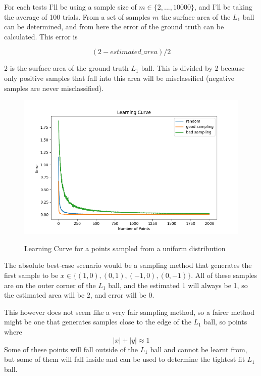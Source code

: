 \documentclass[11pt,a4paper]{article}
\begin{document}
For each tests I'll be using a sample size of $m \in \{2, ... , 10000 \}$, and I'll be taking the average of 100 trials. From a set of samples $m$ the surface area of the  $L_1$ ball can be determined, and from here the error of the ground truth can be calculated. This error is 

\[(2 - \textit{estimated\_area}) / 2\]

$2$ is the surface area of the ground truth $L_1$ ball. This is divided by 2 because only positive samples that fall into this area will be misclassified (negative samples are never misclassified).


\begin{figure}[h]
    \caption{Learning Curve for a points sampled from a uniform distribution}
    \centering
    \includegraphics[width=\textwidth]{learning_curves.png}
    \label{fig:learning_curve}
\end{figure}

The absolute best-case scenario would be a sampling method that generates the first sample to be $x \in \{(1,0), (0,1), (-1,0), (0,-1)\}$.
All of these samples are on the outer corner of the $L_1$ ball, and the estimated $1$ will always be 1, so the estimated area will be $2$, and error will be $0$.

This however does not seem like a very fair sampling method, so a fairer method might be one that generates samples close to the edge of the $L_1$ ball, so points where 
\[|x| + |y| \approx 1\]
Some of these points will fall outside of the $L_1$ ball and cannot be learnt from, but some of them will fall inside and can be used to determine the tightest fit $L_1$ ball.
\end{document}
